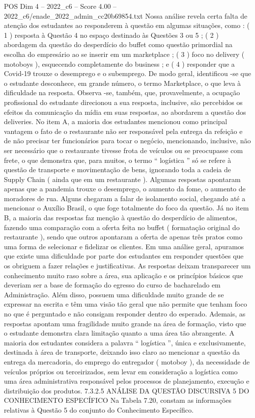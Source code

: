 \begin{textsample}{POS Dim 4 – 2022\_c6 – Score 4.00 – 2022\_c6/enade\_2022\_admin\_cc20b69854.txt}
Nossa análise revela certa falta de atenção dos estudantes ao responderem à questão em algumas situações, como : ( 1 ) resposta à Questão 4 no espaço destinado às Questões 3 ou 5 ; ( 2 ) abordagem da questão do desperdício do buffet como questão primordial na escolha do empresário ao se inserir em um marketplace ; ( 3 ) foco no delivery ( motoboys ), esquecendo completamente do business ; e ( 4 ) responder que a Covid-19 trouxe o desemprego e o subemprego.
De modo geral, identificou -se que o estudante desconhece, em grande número, o termo Marketplace, o que leva à dificuldade na resposta.
Observa -se, também, que, provavelmente, a ocupação profissional do estudante direcionou a sua resposta, inclusive, são percebidos os efeitos da comunicação da mídia em suas respostas, ao abordarem a questão dos deliveries.
No item A, a maioria dos estudantes mencionou como principal vantagem o fato de o restaurante não ser responsável pela entrega da refeição e de não precisar ter funcionários para tocar o negócio, mencionando, inclusive, não ser necessário que o restaurante tivesse frota de veículos ou se preocupasse com frete, o que demonstra que, para muitos, o termo “ logística ” só se refere à questão de transporte e movimentação de bens, ignorando toda a cadeia de Supply Chain ( ainda que em um restaurante ).
Algumas respostas apontaram apenas que a pandemia trouxe o desemprego, o aumento da fome, o aumento de moradores de rua.
Alguns chegaram a falar de isolamento social, chegando até a mencionar o Auxílio Brasil, o que foge totalmente do foco da questão.
Já no item B, a maioria das respostas faz menção à questão do desperdício de alimentos, fazendo uma comparação com a oferta feita no buffet ( formatação original do restaurante ), sendo que outros apontaram a oferta de apenas três pratos como uma forma de selecionar e fidelizar os clientes.
Em uma análise geral, apuramos que existe uma dificuldade por parte dos estudantes em responder questões que os obriguem a fazer relações e justificativas.
As respostas deixam transparecer um conhecimento muito raso sobre a área, sua aplicação e os princípios básicos que deveriam ser a base de formação do egresso do curso de bacharelado em Administração.
Além disso, possuem uma dificuldade muito grande de se expressar na escrita e têm uma visão tão geral que não permite que tenham foco no que é perguntado e não consigam responder dentro do esperado.
Ademais, as respostas apontam uma fragilidade muito grande na área de formação, visto que o estudante demonstra clara limitação quanto a uma área tão abrangente.
A maioria dos estudantes considera a palavra “ logística ”, única e exclusivamente, destinada à área de transporte, deixando isso claro ao mencionar a questão da entrega da mercadoria, do emprego do entregador ( motoboy ), da necessidade de veículos próprios ou terceirizados, sem levar em consideração a logística como uma área administrativa responsável pelos processos de planejamento, execução e distribuição dos produtos. 7.3.2.5 ANÁLISE DA QUESTÃO DISCURSIVA 5 DO CONHECIMENTO ESPECÍFICO Na Tabela 7.20, constam as informações relativas à Questão 5 do conjunto do Conhecimento Específico.

\end{textsample}
